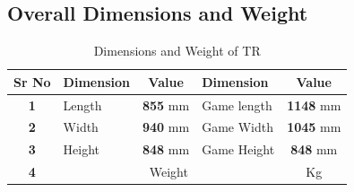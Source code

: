     \subsection{Overall Dimensions and Weight}
        \begin{table}[h]
            \begin{minipage}[t][3.5cm]{\textwidth}
                \begin{minipage}[t]{0.5\textwidth}
                    \centering                
                    \caption{Dimensions and Weight of TR} \label{Dimensions_TR} \small
                    \begin{tabular}{|c|l|c|l|c|}
                        \hline  \hline
                        \textbf{Sr No}  & \textbf{Dimension} & \textbf{Value}  & \textbf{Dimension}      & \textbf{Value}   \\ \hline   \hline
                        \textbf{1}      & Length             & \textbf{855} mm & Game length             & \textbf{1148} mm \\ \hline
                        \textbf{2}      & Width              & \textbf{940} mm & Game Width              & \textbf{1045} mm \\ \hline
                        \textbf{3}      & Height             & \textbf{848} mm & Game Height             & \textbf{848} mm  \\ \hline
                        \textbf{4}      & \multicolumn{3}{c|}{Weight}                                    & \textbf{} Kg     \\ \hline   \hline
                    \end{tabular}
                \end{minipage}

\end{minipage}
\end{table}
